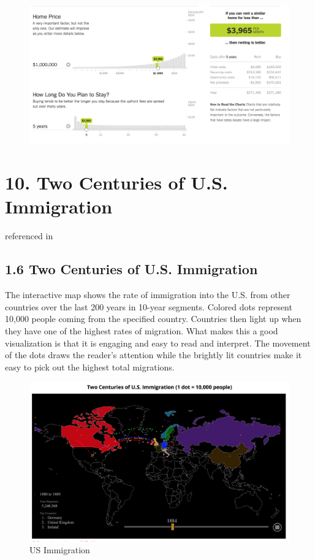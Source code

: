 \documentclass[]{book}
\theoremstyle{definition}
\theoremstyle{definition}
\theoremstyle{definition}
\theoremstyle{remark}
\begin{document}
\begin{figure}
\centering
\includegraphics{images/rentcalc.png}
\caption{}
\end{figure}

\section{10. Two Centuries of U.S.
Immigration}\label{two-centuries-of-u.s.-immigration}

\citep{Immigration} referenced in \citep{cool_data}

\subsection{1.6 Two Centuries of U.S.
Immigration}\label{two-centuries-of-u.s.-immigration-1}

The interactive map shows the rate of immigration into the U.S. from
other countries over the last 200 years in 10-year segments. Colored
dots represent 10,000 people coming from the specified country.
Countries then light up when they have one of the highest rates of
migration. What makes this a good visualization is that it is engaging
and easy to read and interpret. The movement of the dots draws the
reader's attention while the brightly lit countries make it easy to pick
out the highest total migrations.

\begin{figure}
\centering
\includegraphics{images/immigration.png}
\caption{US Immigration}
\end{figure}
\end{document}
